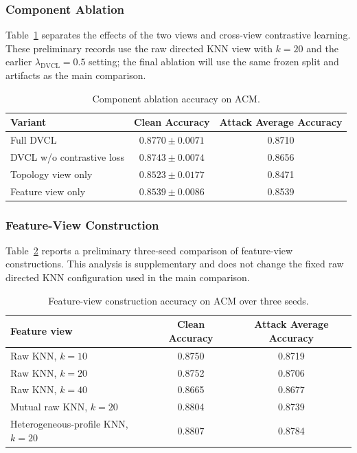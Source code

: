 \subsubsection{Component Ablation}

Table~\ref{tab:component_ablation} separates the effects of the two views and cross-view contrastive learning. These preliminary records use the raw directed KNN view with $k=20$ and the earlier $\lambda_{\mathrm{DVCL}}=0.5$ setting; the final ablation will use the same frozen split and artifacts as the main comparison.

\begin{table}[htbp]
\centering
\caption{Component ablation accuracy on ACM.}
\label{tab:component_ablation}
\begin{tabular}{lcc}
\toprule
Variant & Clean Accuracy & Attack Average Accuracy \\
\midrule
Full DVCL & $0.8770\pm0.0071$ & 0.8710 \\
DVCL w/o contrastive loss & $0.8743\pm0.0074$ & 0.8656 \\
Topology view only & $0.8523\pm0.0177$ & 0.8471 \\
Feature view only & $0.8539\pm0.0086$ & 0.8539 \\
\bottomrule
\end{tabular}
\end{table}

\subsubsection{Feature-View Construction}

Table~\ref{tab:knn_supp} reports a preliminary three-seed comparison of feature-view constructions. This analysis is supplementary and does not change the fixed raw directed KNN configuration used in the main comparison.

\begin{table}[htbp]
\centering
\caption{Feature-view construction accuracy on ACM over three seeds.}
\label{tab:knn_supp}
\begin{tabular}{lcc}
\toprule
Feature view & Clean Accuracy & Attack Average Accuracy \\
\midrule
Raw KNN, $k=10$ & 0.8750 & 0.8719 \\
Raw KNN, $k=20$ & 0.8752 & 0.8706 \\
Raw KNN, $k=40$ & 0.8665 & 0.8677 \\
Mutual raw KNN, $k=20$ & 0.8804 & 0.8739 \\
Heterogeneous-profile KNN, $k=20$ & 0.8807 & 0.8784 \\
\bottomrule
\end{tabular}
\end{table}


